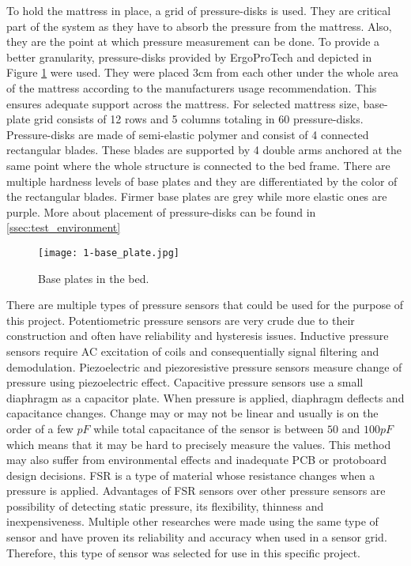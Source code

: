 To hold the mattress in place, a grid of pressure-disks is used. They are critical part of the system as they have to absorb the pressure from the mattress. Also, they are the point at which pressure measurement can be done. To provide a better granularity, pressure-disks provided by ErgoProTech and depicted in Figure \ref{fig:base-plate} were used. They were placed 3cm from each other under the whole area of the mattress according to the manufacturers usage recommendation. This ensures adequate support across the mattress. For selected mattress size, base-plate grid consists of 12 rows and 5 columns totaling in 60 pressure-disks. Pressure-disks are made of semi-elastic polymer and consist of 4 connected rectangular blades. These blades are supported by 4 double arms anchored at the same point where the whole structure is connected to the bed frame. There are multiple hardness levels of base plates and they are differentiated by the color of the rectangular blades. Firmer base plates are grey while more elastic ones are purple. More about placement of pressure-disks can be found in \autoref{ssec:test_environment}

\begin{figure}[h]
  \begin{center}
    \texttt{[image: 1-base\_plate.jpg]}
  \end{center}
  \caption{Base plates in the bed.}
  \label{fig:base-plate}
\end{figure}

There are multiple types of pressure sensors that could be used for the purpose of this project\cite{pressure_sensors}. Potentiometric pressure sensors are very crude due to their construction and often have reliability and hysteresis issues. Inductive pressure sensors require \ac{AC} excitation of coils and consequentially signal filtering and demodulation. Piezoelectric and piezoresistive pressure sensors measure change of pressure using piezoelectric effect. Capacitive pressure sensors use a small diaphragm as a capacitor plate. When pressure is applied, diaphragm deflects and capacitance changes. Change may or may not be linear and usually is on the order of a few $pF$ while total capacitance of the sensor is between $50$ and $100 pF$ which means that it may be hard to precisely measure the values. This method may also suffer from environmental effects and inadequate \ac{PCB} or protoboard design decisions. \ac{FSR} is a type of material whose resistance changes when a pressure is applied. Advantages of \ac{FSR} sensors over other pressure sensors are possibility of detecting static pressure, its flexibility, thinness and inexpensiveness. Multiple other researches were made using the same type of sensor and have proven its reliability and accuracy when used in a sensor grid\cite{pillow_system_1}\cite{pillow_system_2}\cite{apnea_low_cost}. Therefore, this type of sensor was selected for use in this specific project.

